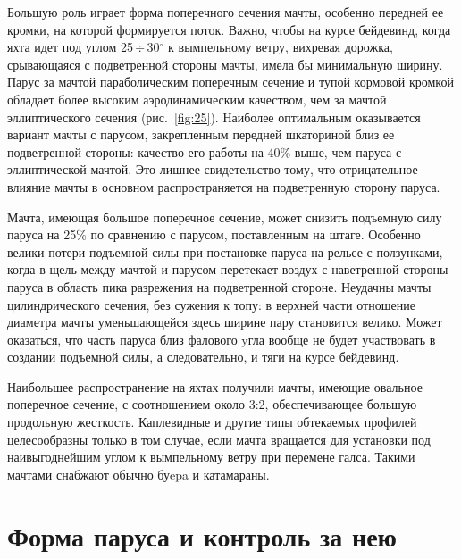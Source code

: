 \documentclass[a4paper, 12pt, twoside, final, book, russian, fittopage, cyremdash]{ncc}
\newcommand{\gr}{\ensuremath{^\circ}\xspace}
\newcommand{\otdo}{\,\ensuremath{\div}\,}
\newcommand{\ris}[1]{\ref{fig:#1}}
\begin{document}
Большую роль играет форма поперечного сечения мачты, особенно передней ее кромки, на которой формируется поток. Важно, чтобы на курсе бейдевинд, когда яхта идет под углом 25\otdo 30\gr к вымпельному ветру, вихревая дорожка, срывающаяся с подветренной стороны мачты, имела бы минимальную ширину. Парус за мачтой параболическим поперечным сечение и тупой кормовой кромкой обладает более высоким аэродинамическим качеством, чем за мачтой эллиптического сечения (рис.~\ris{25}). Наиболее оптимальным оказывается вариант мачты с парусом, закрепленным передней шкаториной близ ее подветренной стороны: качество его работы на 40\% выше, чем паруса с эллиптической мачтой. Это лишнее свидетельство тому, что отрицательное влияние мачты в основном распространяется на подветренную сторону паруса.

Мачта, имеющая большое поперечное сечение, может снизить подъемную силу паруса на 25\% по сравнению с парусом, поставленным на штаге. Особенно велики потери подъемной силы при постановке паруса на рельсе с ползунками, когда в щель между мачтой и парусом перетекает воздух с наветренной стороны паруса в область пика разрежения на подветренной стороне. Неудачны мачты цилиндрического сечения, без сужения к топу: в верхней части отношение диаметра мачты уменьшающейся здесь ширине пару становится велико. Может оказаться, что часть паруса близ фалового yгла вообще не будет участвовать в создании подъемной силы, а следовательно, и тяги на курсе бейдевинд.

Наибольшее распространение на яхтах получили мачты, имеющие овальное поперечное сечение, с соотношением около 3:2, обеспечивающее большую продольную жесткость. Каплевидные и другие типы обтекаемых профилей целесообразны только в том случае, если мачта вращается для установки под наивыгоднейшим углом к вымпельному ветру при перемене галса. Такими мачтами снабжают обычно буepa и катамараны.

\section{Форма паруса и контроль за нею}
\end{document}
